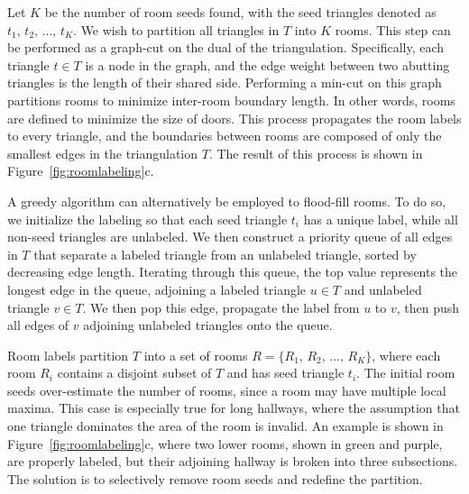 \documentclass[12pt,onecolumn,oneside]{book}
\begin{document}
Let $K$ be the number of room seeds found, with the seed triangles denoted as $t_1,\,t_2,\,...,\,t_K$.  We wish to partition all triangles in $T$ into $K$ rooms.  This step can be performed as a graph-cut on the dual of the triangulation.  Specifically, each triangle $t \in T$ is a node in the graph, and the edge weight between two abutting triangles is the length of their shared side.  Performing a min-cut on this graph partitions rooms to minimize inter-room boundary length.  In other words, rooms are defined to minimize the size of doors.  This process propagates the room labels to every triangle, and the boundaries between rooms are composed of only the smallest edges in the triangulation $T$.  The result of this process is shown in Figure~\ref{fig:roomlabeling}c.

A greedy algorithm can alternatively be employed to flood-fill rooms.  To do so, we initialize the labeling so that each seed triangle $t_i$ has a unique label, while all non-seed triangles are unlabeled.  We then construct a priority queue of all edges in $T$ that separate a labeled triangle from an unlabeled triangle, sorted by decreasing edge length.  Iterating through this queue, the top value represents the longest edge in the queue, adjoining a labeled triangle $u \in T$ and unlabeled triangle $v \in T$.  We then pop this edge, propagate the label from $u$ to $v$, then push all edges of $v$ adjoining unlabeled triangles onto the queue.  


Room labels partition $T$ into a set of rooms $R = \{R_1,\,R_2,\,...,\,R_K\}$, where each room $R_i$ contains a disjoint subset of $T$ and has seed triangle $t_i$.  The initial room seeds over-estimate the number of rooms, since a room may have multiple local maxima.  This case is especially true for long hallways, where the assumption that one triangle dominates the area of the room is invalid.  An example is shown in Figure~\ref{fig:roomlabeling}c, where two lower rooms, shown in green and purple, are properly labeled, but their adjoining hallway is broken into three subsections.  The solution is to selectively remove room seeds and redefine the partition.
\end{document}
